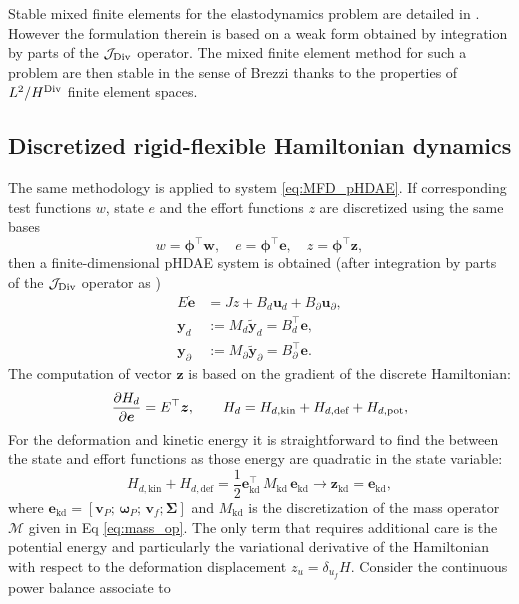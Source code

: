 \begin{remark}
Stable mixed finite elements for the elastodynamics problem are detailed in \cite{ArnoldElasDyn}. However the formulation therein is based on a weak form obtained by integration by parts of the $\mathcal{J}_{\operatorname*{Div}}$ operator. The mixed finite element method for such a problem are then stable in the sense of Brezzi thanks to the properties of $L^2 / H^{\operatorname*{Div}}$ finite element spaces.
\end{remark}

\subsection{Discretized rigid-flexible Hamiltonian dynamics}

The same methodology is applied to system \eqref{eq:MFD_pHDAE}. If corresponding test functions $w$, state $e$ and the effort functions $z$ are discretized using the same bases
\[ w = \bm{\phi}^\top \bm{w}, \quad e = \bm{\phi}^\top \bm{e}, \quad z = \bm{\phi}^\top \bm{z},
\]
then a finite-dimensional pHDAE system is obtained (after integration by parts of the $\mathcal{J}_{\operatorname*{Div}}$ operator as )
\begin{equation}
	\begin{aligned}
	{E} \dot{\bm{e}} &= {J z} + {B}_d \bm{u}_d + {B}_\partial \bm{u}_\partial, \\
	\bm{y}_d &:= {M}_d \widetilde{\bm{y}}_d = {B}_d^\top \bm{e},  \\
	\bm{y}_\partial &:= {M}_\partial \widetilde{\bm{y}}_\partial = {B}_\partial^\top \bm{e}.
	\end{aligned}
\end{equation}
The computation of vector $\bm{z}$ is based on the gradient of the discrete Hamiltonian:
\[
\diffp{H_d}{\bm{e}} = {E}^\top \bm{z}, \qquad H_d = H_{d, \text{kin}}+H_{d, \text{def}}+H_{d, \text{pot}},
\]
For the deformation and kinetic energy it is straightforward to find the between the state and effort functions as those energy are quadratic in the state variable:
\begin{equation}
H_{d, \text{kin}} + H_{d, \text{def}} = \frac{1}{2} \bm{e}_{\text{kd}}^\top \, {M}_{\text{kd}} \, \bm{e}_{\text{kd}} \longrightarrow \bm{z}_{\text{kd}} = \bm{e}_{\text{kd}},
\end{equation}
where $\bm{e}_{\text{kd}} = [\bm{v}_P; \, \bm{\omega}_P; \, \bm{v}_f; \bm{\Sigma}]$ and ${M}_{\text{kd}}$ is the discretization of the mass operator $\mathcal{M}$ given in Eq \eqref{eq:mass_op}. 
The only term that requires additional care is the potential energy and particularly the variational derivative of the Hamiltonian with respect to the deformation displacement $z_{u}=\delta_{u_f} H$.  Consider the continuous power balance associate to
